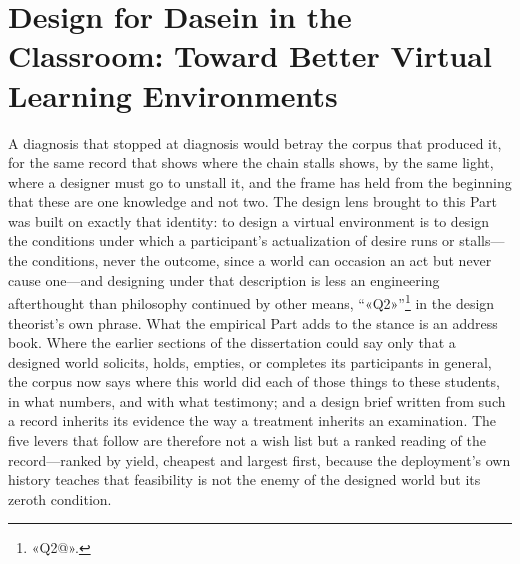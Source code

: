 
\section{Design for Dasein in the Classroom: Toward Better Virtual Learning Environments}

A diagnosis that stopped at diagnosis would betray the corpus that produced it, for the same record that shows where the chain stalls shows, by the same light, where a designer must go to unstall it, and the frame has held from the beginning that these are one knowledge and not two. The design lens brought to this Part was built on exactly that identity: to design a virtual environment is to design the conditions under which a participant's actualization of desire runs or stalls---the conditions, never the outcome, since a world can occasion an act but never cause one---and designing under that description is less an engineering afterthought than philosophy continued by other means, ``«Q2»''\footnote{«Q2@».} in the design theorist's own phrase. What the empirical Part adds to the stance is an address book. Where the earlier sections of the dissertation could say only that a designed world solicits, holds, empties, or completes its participants in general, the corpus now says where this world did each of those things to these students, in what numbers, and with what testimony; and a design brief written from such a record inherits its evidence the way a treatment inherits an examination. The five levers that follow are therefore not a wish list but a ranked reading of the record---ranked by yield, cheapest and largest first, because the deployment's own history teaches that feasibility is not the enemy of the designed world but its zeroth condition.

